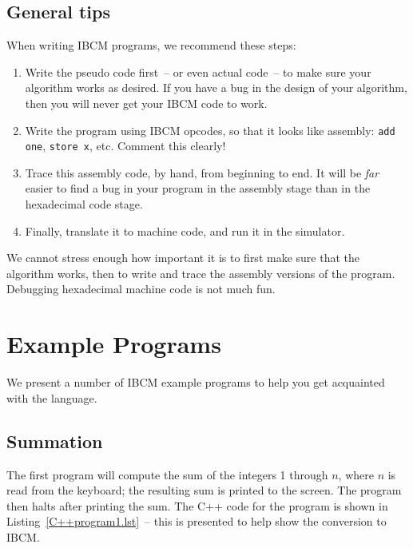 \subsection{General tips}

When writing IBCM programs, we recommend these steps:

\begin{enumerate}
\item Write the pseudo code first~-- or even actual code~-- to make
  sure your algorithm works as desired.  If you have a bug in the
  design of your algorithm, then you will never get your IBCM code to
  work.
\item Write the program using IBCM opcodes, so that it looks like
  assembly: {\tt add one}, {\tt store x}, etc.  Comment this clearly!
\item Trace this assembly code, by hand, from beginning to end.  It
  will be {\em far} easier to find a bug in your program in the
  assembly stage than in the hexadecimal code stage.
\item Finally, translate it to machine code, and run it in the
  simulator.
\end{enumerate}

We cannot stress enough how important it is to first make sure that
the algorithm works, then to write and trace the assembly versions of
the program.  Debugging hexadecimal machine code is not much fun.



\section{Example Programs}


We present a number of IBCM example programs to help you get
acquainted with the language.

\subsection{Summation}

\begin{figure}

\vspace{-0.25in}
\end{figure}

The first program will compute the sum of the integers 1 through $n$,
where $n$ is read from the keyboard; the resulting sum is printed to
the screen. The program then halts after printing the sum.  The C++
code for the program is shown in Listing~\ref{C++program1.lst}~-- this is
presented to help show the conversion to IBCM.

